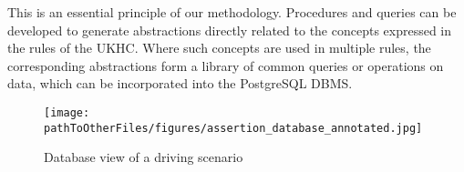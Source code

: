 This is an essential principle of our methodology. Procedures and queries can be developed to generate abstractions directly related to the concepts expressed in the rules of the UKHC. 
Where such concepts are used in multiple rules, the corresponding abstractions form a library of common queries or operations on data, which can be incorporated into the PostgreSQL DBMS. %
%
%
%        
%

\begin{figure}
    \centering
    \texttt{[image: \\pathToOtherFiles/figures/assertion\_database\_annotated.jpg]}
    \caption{Database view of a driving scenario}
    \label{fig:assertion_database_annotated}
\end{figure}

